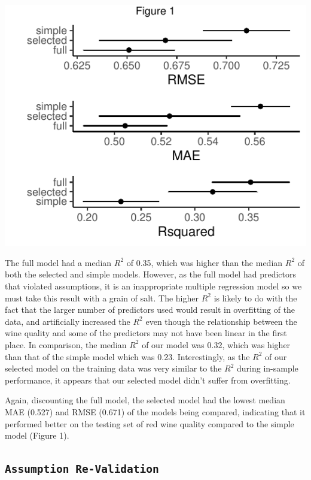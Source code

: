 \documentclass[letterpaper,8pt,twocolumn,twoside,]{pinp}
\begin{document}
\begin{center}\includegraphics{pinp_files/figure-latex/unnamed-chunk-2-1} \end{center}

The full model had a median \(R^2\) of 0.35, which was higher than the
median \(R^2\) of both the selected and simple models. However, as the
full model had predictors that violated assumptions, it is an
inappropriate multiple regression model so we must take this result with
a grain of salt. The higher \(R^2\) is likely to do with the fact that
the larger number of predictors used would result in overfitting of the
data, and artificially increased the \(R^2\) even though the
relationship between the wine quality and some of the predictors may not
have been linear in the first place. In comparison, the median \(R^2\)
of our model was 0.32, which was higher than that of the simple model
which was 0.23. Interestingly, as the \(R^2\) of our selected model on
the training data was very similar to the \(R^2\) during in-sample
performance, it appears that our selected model didn't suffer from
overfitting.

Again, discounting the full model, the selected model had the lowest
median MAE (0.527) and RMSE (0.671) of the models being compared,
indicating that it performed better on the testing set of red wine
quality compared to the simple model (Figure 1).

\hypertarget{assumption-re-validation}{%
\subsection{\texorpdfstring{\texttt{Assumption\ Re-Validation}}{Assumption Re-Validation}}\label{assumption-re-validation}}
\end{document}
